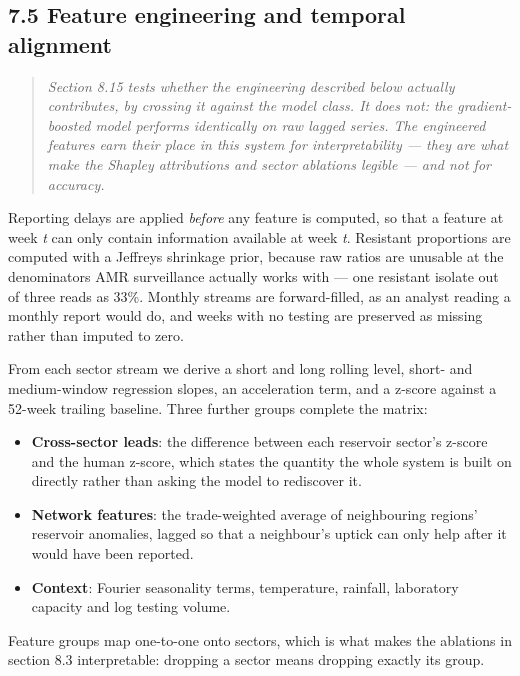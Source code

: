 \documentclass[11pt,a4paper]{article}
\begin{document}
\subsection*{7.5 Feature engineering and temporal alignment}

\begin{quote}\emph{Section 8.15 tests whether the engineering described below actually contributes, by crossing it against the model class. It does not: the gradient-boosted model performs identically on raw lagged series. The engineered features earn their place in this system for interpretability — they are what make the Shapley attributions and sector ablations legible — and not for accuracy.}\end{quote}

Reporting delays are applied \emph{before} any feature is computed, so that a feature at week \emph{t} can only contain information available at week \emph{t}. Resistant proportions are computed with a Jeffreys shrinkage prior, because raw ratios are unusable at the denominators AMR surveillance actually works with — one resistant isolate out of three reads as 33\%. Monthly streams are forward-filled, as an analyst reading a monthly report would do, and weeks with no testing are preserved as missing rather than imputed to zero.

From each sector stream we derive a short and long rolling level, short- and medium-window regression slopes, an acceleration term, and a z-score against a 52-week trailing baseline. Three further groups complete the matrix:

\begin{itemize}[leftmargin=1.3em,itemsep=2pt]
  \item \textbf{Cross-sector leads}: the difference between each reservoir sector's z-score and the human z-score, which states the quantity the whole system is built on directly rather than asking the model to rediscover it.
  \item \textbf{Network features}: the trade-weighted average of neighbouring regions' reservoir anomalies, lagged so that a neighbour's uptick can only help after it would have been reported.
  \item \textbf{Context}: Fourier seasonality terms, temperature, rainfall, laboratory capacity and log testing volume.
\end{itemize}

Feature groups map one-to-one onto sectors, which is what makes the ablations in section 8.3 interpretable: dropping a sector means dropping exactly its group.
\end{document}
